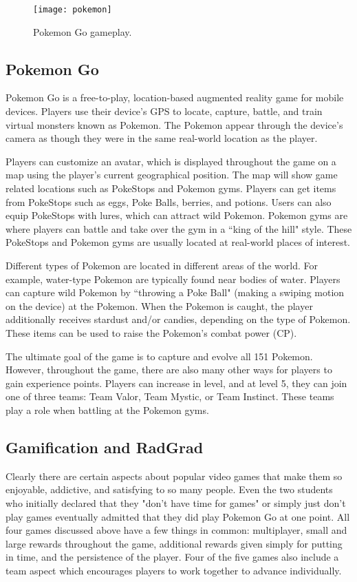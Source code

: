 \begin{figure}[h]
\centering
\texttt{[image: pokemon]}
\caption{Pokemon Go gameplay.}
\end{figure}	
\subsection{Pokemon Go}
Pokemon Go is a free-to-play, location-based augmented reality game for mobile devices. Players use their device's GPS to locate, capture, battle, and train virtual monsters known as Pokemon. The Pokemon appear through the device's camera as though they were in the same real-world location as the player. 

Players can customize an avatar, which is displayed throughout the game on a map using the player's current geographical position. The map will show game related locations such as PokeStops and Pokemon gyms. Players can get items from PokeStops such as eggs, Poke Balls, berries, and potions. Users can also equip PokeStops with lures, which can attract wild Pokemon. Pokemon gyms are where players can battle and take over the gym in a ``king of the hill" style. These PokeStops and Pokemon gyms are usually located at real-world places of interest. 

Different types of Pokemon are located in different areas of the world. For example, water-type Pokemon are typically found near bodies of water. Players can capture wild Pokemon by ``throwing a Poke Ball" (making a swiping motion on the device) at the Pokemon. When the Pokemon is caught, the player additionally receives stardust and/or candies, depending on the type of Pokemon. These items can be used to raise the Pokemon's combat power (CP). 

The ultimate goal of the game is to capture and evolve all 151 Pokemon. However, throughout the game, there are also many other ways for players to gain experience points. Players can increase in level, and at level 5, they can join one of three teams: Team Valor, Team Mystic, or Team Instinct. These teams play a role when battling at the Pokemon gyms. 

\subsection{Gamification and RadGrad}
Clearly there are certain aspects about popular video games that make them so enjoyable, addictive, and satisfying to so many people. Even the two students who initially declared that they "don't have time for games" or simply just don't play games eventually admitted that they did play Pokemon Go at one point. All four games discussed above have a few things in common: multiplayer, small and large rewards throughout the game, additional rewards given simply for putting in time, and the persistence of the player. Four of the five games also include a team aspect which encourages players to work together to advance individually. 

